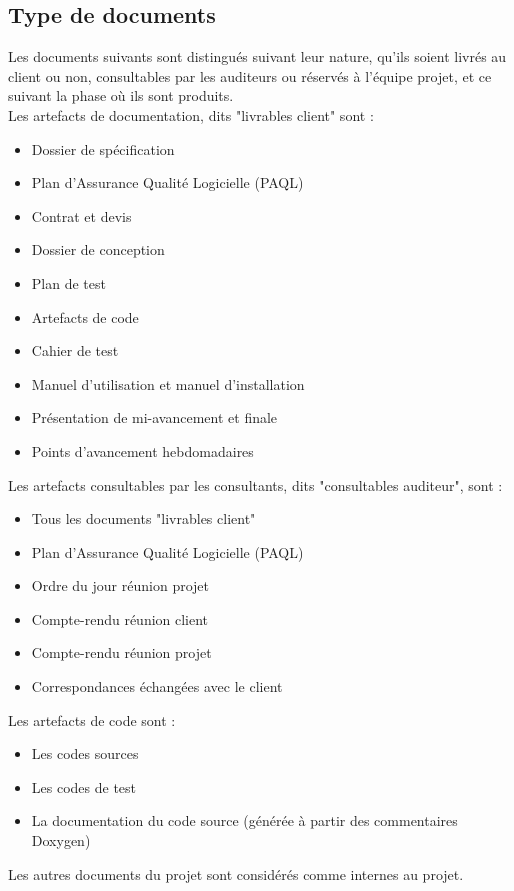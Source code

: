 \documentclass[a4paper,11pt,titlepage]{article}
\begin{document}
\subsection{Type de documents}
Les documents suivants sont distingués suivant leur nature,
qu'ils soient livrés au client ou non, consultables par
les auditeurs ou réservés à l'équipe projet, et ce suivant
la phase où ils sont produits.\\
Les artefacts de documentation, dits "livrables client" sont :
\begin{itemize}
    \item Dossier de spécification
    \item Plan d'Assurance Qualité Logicielle (PAQL)
    \item Contrat et devis
    \item Dossier de conception
    \item Plan de test
    \item Artefacts de code
    \item Cahier de test
    \item Manuel d'utilisation et manuel d'installation
    \item Présentation de mi-avancement et finale
    \item Points d'avancement hebdomadaires
\end{itemize}
Les artefacts consultables par les consultants,
dits "consultables auditeur", sont :
\begin{itemize}
    \item Tous les documents "livrables client"
    \item Plan d'Assurance Qualité Logicielle (PAQL)
    \item Ordre du jour réunion projet
    \item Compte-rendu réunion client
    \item Compte-rendu réunion projet
    \item Correspondances échangées avec le client
\end{itemize}
Les artefacts de code sont :
\begin{itemize}
    \item Les codes sources
    \item Les codes de test
    \item La documentation du code source (générée à partir des commentaires Doxygen)
\end{itemize}
Les autres documents du projet sont considérés comme internes au projet.
\end{document}
